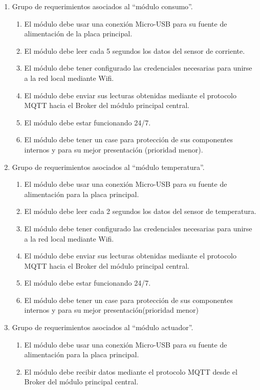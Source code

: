 \documentclass[11pt]{charter}
\begin{document}
\begin{enumerate}
\item Grupo de requerimientos asociados al ``módulo consumo''.
	\begin{enumerate}
	\item El módulo debe usar una conexión Micro-USB para su fuente de alimentación de la placa principal.
	\item El módulo debe leer cada 5 segundos los datos del sensor de corriente.
	\item El módulo debe tener configurado las credenciales necesarias para unirse a la red local mediante Wifi.
	\item El módulo debe enviar sus lecturas obtenidas mediante el protocolo MQTT hacia el Broker del módulo principal central.
	\item El módulo debe estar funcionando 24/7.
	\item El módulo debe tener un case para protección de sus componentes internos y para su mejor presentación (prioridad menor).
	\end{enumerate}	
\item Grupo de requerimientos asociados al ``módulo temperatura''.
	\begin{enumerate}
	\item El módulo debe usar una conexión Micro-USB para su fuente de alimentación para la placa principal.
	\item El módulo debe leer cada 2 segundos los datos del sensor de temperatura.
	\item El módulo debe tener configurado las credenciales necesarias para unirse a la red local mediante Wifi.
	\item El módulo debe enviar sus lecturas obtenidas mediante el protocolo MQTT hacia el Broker del módulo principal central.
	\item El módulo debe estar funcionando 24/7.
	\item El módulo debe tener un case para protección de sus componentes internos y para su mejor presentación(prioridad menor)
	\end{enumerate}	
\item Grupo de requerimientos asociados al ``módulo actuador''.
	\begin{enumerate}
	\item El módulo debe usar una conexión Micro-USB para su fuente de alimentación para la placa principal.
		\item El módulo debe recibir datos mediante el protocolo MQTT desde el Broker del módulo principal central.

\end{enumerate}
\end{enumerate}
\end{document}
